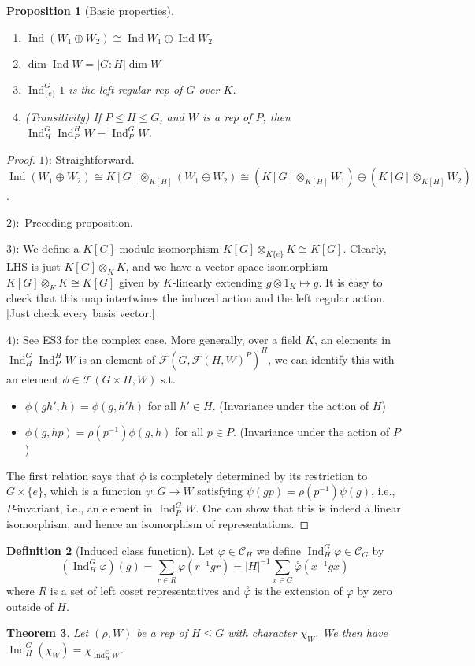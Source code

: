 \documentclass{article}
\theoremstyle{definition}
\newtheorem{defn}{Definition}[section]
\theoremstyle{remark}
\theoremstyle{plain}
\newtheorem{thm}[defn]{Theorem}
\newtheorem{prop}[defn]{Proposition}
\begin{document}
\begin{prop}[Basic properties]
    \begin{enumerate}
        \item $\operatorname{Ind}(W_1\oplus W_2)\cong \operatorname{Ind}W_1\oplus\operatorname{Ind}W_2$
        \item $\dim\operatorname{Ind}W=|G:H|\dim W$
        \item $\operatorname{Ind}_{\{e\}}^G1$ is the left regular rep of $G$ over $K$.
        \item (Transitivity) If $P\le H\le G$, and $W$ is a rep of $P$, then $\operatorname{Ind}_H^G\operatorname{Ind}_P^HW=\operatorname{Ind}_P^GW$.
    \end{enumerate}
\end{prop}
\begin{proof}
    $1)$: Straightforward. $\operatorname{Ind}(W_1\oplus W_2)\cong K[G]\otimes_{K[H]}(W_1\oplus W_2)\cong (K[G]\otimes_{K[H]}W_1)\oplus (K[G]\otimes_{K[H]}W_2)$.

    $2):$ Preceding proposition.

    $3)$: We define a $K[G]$-module isomorphism $K[G]\otimes_{K\{e\}}K\cong K[G]$. Clearly, LHS is just $K[G]\otimes_K K$, and we have a vector space isomorphism $K[G]\otimes_KK\cong K[G]$ given by $K$-linearly extending $g\otimes 1_K\mapsto g$. It is easy to check that this map intertwines the induced action and the left regular action. [Just check every basis vector.]

    $4)$: See ES3 for the complex case. More generally, over a field $K$, an elements in $\operatorname{Ind}_H^G\operatorname{Ind}_P^HW$ is an element of $\mathcal{F}(G,\mathcal{F}(H,W)^P)^H$, we can identify this with an element $\phi\in\mathcal F(G\times H,W)$ s.t.
    \begin{itemize}
        \item $\phi(gh',h)=\phi(g,h'h)$ for all $h'\in H$. (Invariance under the action of $H$)
        \item $\phi(g,hp)=\rho(p^{-1})\phi(g,h)$ for all $p\in P$. (Invariance under the action of $P$)
    \end{itemize}
    The first relation says that $\phi$ is completely determined by its restriction to $G\times \{e\}$, which is a function $\psi:G\to W$ satisfying $\psi(gp)=\rho(p^{-1})\psi(g)$, i.e., $P$-invariant, i.e., an element in $\operatorname{Ind}_P^GW$. One can show that this is indeed a linear isomorphism, and hence an isomorphism of representations.
\end{proof}
\begin{defn}[Induced class function]
    Let $\varphi\in\mathcal{C}_H$ we define $\operatorname{Ind}_H^G\varphi\in\mathcal{C}_G$ by
    \[(\operatorname{Ind}_H^G\varphi)(g)=\sum_{r\in R}\varphi(r^{-1}gr)=|H|^{-1}\sum_{x\in G}\overset{\circ}{\varphi}(x^{-1}gx)\]
    where $R$ is a set of left coset representatives and $\overset{\circ}{\varphi}$ is the extension of $\varphi$ by zero outside of $H$.
\end{defn}
\begin{thm}
    Let $(\rho,W)$ be a rep of $H\le G$ with character $\chi_W$. We then have
    $\operatorname{Ind}_H^G(\chi_W)=\chi_{\operatorname{Ind}_H^GW}$.
\end{thm}
\end{document}
